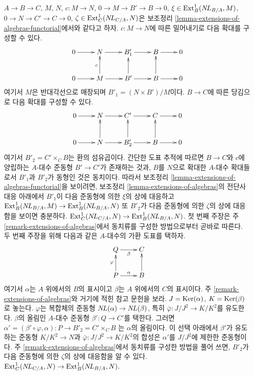 \begin{remark}
\label{remark-extensions-of-algebras-functorial}
$A\to B\to C$, $M$, $N$, $c:M\to N$,
$0\to M\to B'\to B\to0$, $\xi\in\mathop{\mathrm{Ext}}\nolimits^1_B(\mathop{N\!L}\nolimits_{B/A},M)$,
$0\to N\to C'\to C\to0$, $\zeta\in\mathop{\mathrm{Ext}}\nolimits^1_C(\mathop{N\!L}\nolimits_{C/A},N)$은
보조정리 \ref{lemma-extensions-of-algebras-functorial}에서와 같다고 하자.
$c:M\to N$에 따른 밀어내기로 다음 확대를 구성할 수 있다.
$$
\xymatrix{
0 \ar[r] & N \ar[r] & B'_1 \ar[r] & B \ar[r] & 0 \\
0 \ar[r] & M \ar[u]^c \ar[r] & B' \ar[u] \ar[r] & B \ar[u] \ar[r] & 0
}
$$
여기서 $M$은 반대각선으로 매장되며 $B'_1=(N\times B')/M$이다.
$B\to C$에 따른 당김으로 다음 확대를 구성할 수 있다.
$$
\xymatrix{
0 \ar[r] & N \ar[r] & C' \ar[r] & C \ar[r] & 0 \\
0 \ar[r] & N \ar[u] \ar[r] & B'_2 \ar[u] \ar[r] & B \ar[u] \ar[r] & 0
}
$$
여기서 $B'_2=C'\times_C B$는 환의 섬유곱이다. 간단한 도표 추적에
따르면 $B\to C$와 $c$에 양립하는 $A$-대수 준동형 $B'\to C'$가
존재하는 것과, $B$를 $N$으로 확대한 $A$-대수 확대들로서 $B'_1$과
$B'_2$가 동형인 것은 동치이다. 따라서 보조정리
\ref{lemma-extensions-of-algebras-functorial}을 보이려면, 보조정리
\ref{lemma-extensions-of-algebras}의 전단사 대응 아래에서 $B'_1$이
다음 준동형에 의한 $\xi$의 상에 대응하고
$\mathop{\mathrm{Ext}}\nolimits^1_B(\mathop{N\!L}\nolimits_{B/A}, M) \to \mathop{\mathrm{Ext}}\nolimits^1_B(\mathop{N\!L}\nolimits_{B/A}, N)$
또 $B'_2$가 다음 준동형에 의한 $\zeta$의 상에 대응함을 보이면 충분하다.
$\mathop{\mathrm{Ext}}\nolimits^1_C(\mathop{N\!L}\nolimits_{C/A}, N) \to \mathop{\mathrm{Ext}}\nolimits^1_B(\mathop{N\!L}\nolimits_{B/A}, N)$.
첫 번째 주장은 주 \ref{remark-extensions-of-algebras}에서 동치류를
구성한 방법으로부터 곧바로 따른다. 두 번째 주장을 위해 다음과 같은
$A$-대수의 가환 도표를 택하자.
$$
\xymatrix{
Q \ar[r]_\beta & C \\
P \ar[u]^\varphi \ar[r]^\alpha & B \ar[u]
}
$$
여기서 $\alpha$는 $A$ 위에서의 $B$의 표시이고 $\beta$는 $A$ 위에서의
$C$의 표시이다. 주 \ref{remark-extensions-of-algebras}와 거기에 적힌
참고 문헌을 보라. $J=\mathop{\mathrm{Ker}}(\alpha)$, $K=\mathop{\mathrm{Ker}}(\beta)$로 놓는다.
$\varphi$는 복합체의 준동형 $\mathop{N\!L}\nolimits(\alpha)\to\mathop{N\!L}\nolimits(\beta)$, 특히
$\bar\varphi:J/J^2\to K/K^2$를 유도한다. $\beta$의 올림인
$A$-대수 준동형 $\beta':Q\to C'$를 택한다. 그러면
$\alpha' = (\beta' \circ \varphi, \alpha) : P \to B'_2 = C' \times_C B$
는 $\alpha$의 올림이다. 이 선택 아래에서 $\beta'$가 유도하는 준동형
$K/K^2\to N$과 $\bar\varphi:J/J^2\to K/K^2$의 합성은
$\alpha'$를 $J/J^2$에 제한한 준동형이다. 주
\ref{remark-extensions-of-algebras}에서 동치류를 구성한 방법을 풀어 쓰면,
$B'_2$가 다음 준동형에 의한 $\zeta$의 상에 대응함을 알 수 있다.
$\mathop{\mathrm{Ext}}\nolimits^1_C(\mathop{N\!L}\nolimits_{C/A}, N) \to \mathop{\mathrm{Ext}}\nolimits^1_B(\mathop{N\!L}\nolimits_{B/A}, N)$.
\end{remark}

